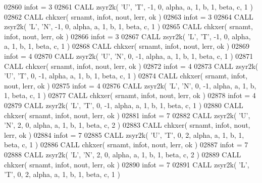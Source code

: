 \begin{DoxyCode}
02860       infot = 3
02861       \textcolor{keyword}{CALL }zsyr2k( \textcolor{stringliteral}{'U'}, \textcolor{stringliteral}{'T'}, -1, 0, alpha, a, 1, b, 1, beta, c, 1 )
02862       \textcolor{keyword}{CALL }chkxer( srnamt, infot, nout, lerr, ok )
02863       infot = 3
02864       \textcolor{keyword}{CALL }zsyr2k( \textcolor{stringliteral}{'L'}, \textcolor{stringliteral}{'N'}, -1, 0, alpha, a, 1, b, 1, beta, c, 1 )
02865       \textcolor{keyword}{CALL }chkxer( srnamt, infot, nout, lerr, ok )
02866       infot = 3
02867       \textcolor{keyword}{CALL }zsyr2k( \textcolor{stringliteral}{'L'}, \textcolor{stringliteral}{'T'}, -1, 0, alpha, a, 1, b, 1, beta, c, 1 )
02868       \textcolor{keyword}{CALL }chkxer( srnamt, infot, nout, lerr, ok )
02869       infot = 4
02870       \textcolor{keyword}{CALL }zsyr2k( \textcolor{stringliteral}{'U'}, \textcolor{stringliteral}{'N'}, 0, -1, alpha, a, 1, b, 1, beta, c, 1 )
02871       \textcolor{keyword}{CALL }chkxer( srnamt, infot, nout, lerr, ok )
02872       infot = 4
02873       \textcolor{keyword}{CALL }zsyr2k( \textcolor{stringliteral}{'U'}, \textcolor{stringliteral}{'T'}, 0, -1, alpha, a, 1, b, 1, beta, c, 1 )
02874       \textcolor{keyword}{CALL }chkxer( srnamt, infot, nout, lerr, ok )
02875       infot = 4
02876       \textcolor{keyword}{CALL }zsyr2k( \textcolor{stringliteral}{'L'}, \textcolor{stringliteral}{'N'}, 0, -1, alpha, a, 1, b, 1, beta, c, 1 )
02877       \textcolor{keyword}{CALL }chkxer( srnamt, infot, nout, lerr, ok )
02878       infot = 4
02879       \textcolor{keyword}{CALL }zsyr2k( \textcolor{stringliteral}{'L'}, \textcolor{stringliteral}{'T'}, 0, -1, alpha, a, 1, b, 1, beta, c, 1 )
02880       \textcolor{keyword}{CALL }chkxer( srnamt, infot, nout, lerr, ok )
02881       infot = 7
02882       \textcolor{keyword}{CALL }zsyr2k( \textcolor{stringliteral}{'U'}, \textcolor{stringliteral}{'N'}, 2, 0, alpha, a, 1, b, 1, beta, c, 2 )
02883       \textcolor{keyword}{CALL }chkxer( srnamt, infot, nout, lerr, ok )
02884       infot = 7
02885       \textcolor{keyword}{CALL }zsyr2k( \textcolor{stringliteral}{'U'}, \textcolor{stringliteral}{'T'}, 0, 2, alpha, a, 1, b, 1, beta, c, 1 )
02886       \textcolor{keyword}{CALL }chkxer( srnamt, infot, nout, lerr, ok )
02887       infot = 7
02888       \textcolor{keyword}{CALL }zsyr2k( \textcolor{stringliteral}{'L'}, \textcolor{stringliteral}{'N'}, 2, 0, alpha, a, 1, b, 1, beta, c, 2 )
02889       \textcolor{keyword}{CALL }chkxer( srnamt, infot, nout, lerr, ok )
02890       infot = 7
02891       \textcolor{keyword}{CALL }zsyr2k( \textcolor{stringliteral}{'L'}, \textcolor{stringliteral}{'T'}, 0, 2, alpha, a, 1, b, 1, beta, c, 1 )

\end{DoxyCode}
